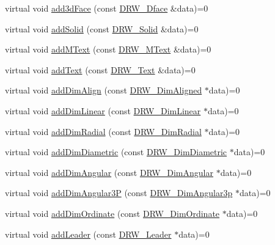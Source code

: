 \begin{DoxyCompactItemize}
\item 
virtual void \hyperlink{class_d_r_w___interface_a1664ed6d78dda11cf323776f594413fb}{add3d\+Face} (const \hyperlink{class_d_r_w__3_dface}{D\+R\+W\+\_\+Dface} \&data)=0
\item 
virtual void \hyperlink{class_d_r_w___interface_a1d50d3aae16fb70d997b82f1bf2cbb4f}{add\+Solid} (const \hyperlink{class_d_r_w___solid}{D\+R\+W\+\_\+\+Solid} \&data)=0
\item 
virtual void \hyperlink{class_d_r_w___interface_a2a9e71a0794a3f8f5191bd9bc9e51bad}{add\+M\+Text} (const \hyperlink{class_d_r_w___m_text}{D\+R\+W\+\_\+\+M\+Text} \&data)=0
\item 
virtual void \hyperlink{class_d_r_w___interface_a13be257d7e54629f3173fad53448c0a7}{add\+Text} (const \hyperlink{class_d_r_w___text}{D\+R\+W\+\_\+\+Text} \&data)=0
\item 
virtual void \hyperlink{class_d_r_w___interface_a6f351237a9d4f10c3f9651c68966a3fb}{add\+Dim\+Align} (const \hyperlink{class_d_r_w___dim_aligned}{D\+R\+W\+\_\+\+Dim\+Aligned} $\ast$data)=0
\item 
virtual void \hyperlink{class_d_r_w___interface_a81d63111186b65e662fd0fecfa09da2e}{add\+Dim\+Linear} (const \hyperlink{class_d_r_w___dim_linear}{D\+R\+W\+\_\+\+Dim\+Linear} $\ast$data)=0
\item 
virtual void \hyperlink{class_d_r_w___interface_a50307476a7aa8065ee5462cd7fdce3c6}{add\+Dim\+Radial} (const \hyperlink{class_d_r_w___dim_radial}{D\+R\+W\+\_\+\+Dim\+Radial} $\ast$data)=0
\item 
virtual void \hyperlink{class_d_r_w___interface_a63948977f0a34dd29697f0db7e24a6ed}{add\+Dim\+Diametric} (const \hyperlink{class_d_r_w___dim_diametric}{D\+R\+W\+\_\+\+Dim\+Diametric} $\ast$data)=0
\item 
virtual void \hyperlink{class_d_r_w___interface_af53ce2878a9327464897aa1cb8e7a333}{add\+Dim\+Angular} (const \hyperlink{class_d_r_w___dim_angular}{D\+R\+W\+\_\+\+Dim\+Angular} $\ast$data)=0
\item 
virtual void \hyperlink{class_d_r_w___interface_abdeea17ef54bd623e569f492943f1e9d}{add\+Dim\+Angular3\+P} (const \hyperlink{class_d_r_w___dim_angular3p}{D\+R\+W\+\_\+\+Dim\+Angular3p} $\ast$data)=0
\item 
virtual void \hyperlink{class_d_r_w___interface_ab3e89843322248d2a0e87dedb9cb9aec}{add\+Dim\+Ordinate} (const \hyperlink{class_d_r_w___dim_ordinate}{D\+R\+W\+\_\+\+Dim\+Ordinate} $\ast$data)=0
\item 
virtual void \hyperlink{class_d_r_w___interface_a10b2f081689b5a89e3cced928e60369a}{add\+Leader} (const \hyperlink{class_d_r_w___leader}{D\+R\+W\+\_\+\+Leader} $\ast$data)=0

\end{DoxyCompactItemize}
